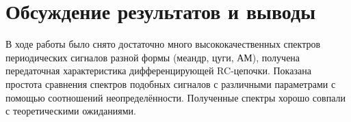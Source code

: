 \documentclass[12pt, a4paper]{article}
\begin{document}
\section{Обсуждение результатов и выводы}
В ходе работы было снято достаточно много высококачественных спектров периодических сигналов разной формы (меандр, цуги, АМ), получена передаточная характеристика дифференцирующей RC-цепочки. Показана простота сравнения спектров подобных сигналов с различными параметрами с помощью соотношений неопределённости. Полученные спектры хорошо совпали с теоретическими ожиданиями.
\end{document}

